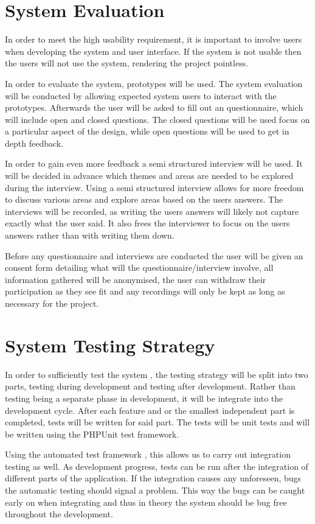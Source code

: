 \documentclass[a4paper,oneside,11pt]{report}
\begin{document}
\section{System Evaluation}
In order to meet the high usability requirement, it is important to involve users when developing the system and user interface. If the system is not usable then the users will not use the system, rendering the project pointless.

In order to evaluate the system, prototypes will be used. The system evaluation will be conducted by allowing expected system users to interact with the prototypes. Afterwards the user will be asked to fill out an questionnaire, which will include open and closed questions. The closed questions will be used focus on a particular aspect of the design, while open questions will be used to get in depth feedback. 

In order to gain even more feedback a semi structured interview will be used. It will be decided in advance which themes and areas are needed to be explored during the interview. Using a semi structured interview allows for more freedom to discuss various areas and explore areas based on the users answers. The interviews will be recorded, as writing the users answers will likely not capture exactly what the user said. It also frees the interviewer to focus on the users answers rather than with writing them down.

Before any questionnaire and interviews are conducted the user will be given an consent form detailing what will the questionnaire/interview involve, all information gathered will be anonymised, the user can withdraw their participation as they see fit and any recordings will only be kept as long as necessary for the project.
\section{System Testing Strategy}
In order to sufficiently test the system , the testing strategy will be split into two parts, testing during development and testing after development.
Rather than testing being a separate phase in development, it will be integrate into the development cycle. After each feature and or the smallest independent part is completed, tests will be written for said part. The tests will be unit tests and will be written using the PHPUnit test framework. 

Using the automated test framework , this allows us to carry out integration testing as well. As development progress, tests can be run after the integration of different parts of the application. If the integration causes any unforeseen, bugs the automatic testing should signal a problem. This way the bugs can be caught early on when integrating and thus in theory the system should be bug free throughout the development.
\end{document}

